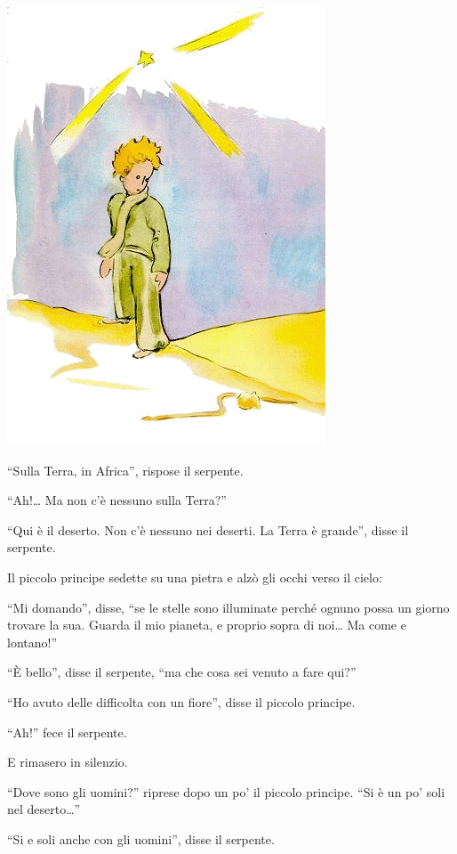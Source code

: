 \documentclass[11pt]{scrbook}
\begin{document}
\begin{center}
\includegraphics{img/17a}
\end{center}

``Sulla Terra, in Africa'', rispose il serpente.

``Ah!\ldots{} Ma non c'è nessuno sulla Terra?''

``Qui è il deserto. Non c'è nessuno nei deserti. La Terra è grande'', disse il serpente.

Il piccolo principe sedette su una pietra e alzò gli occhi verso il cielo:

``Mi domando'', disse, ``se le stelle sono illuminate perché ognuno possa un giorno trovare la sua. Guarda il mio pianeta, e proprio sopra di noi\ldots{} Ma come e lontano!''

``È bello'', disse il serpente, ``ma che cosa sei venuto a fare qui?''

``Ho avuto delle difficolta con un fiore'', disse il piccolo principe.

``Ah!'' fece il serpente.

E rimasero in silenzio.

``Dove sono gli uomini?'' riprese dopo un po' il piccolo principe. ``Si è un po' soli nel deserto\ldots{}''

``Si e soli anche con gli uomini'', disse il serpente.
\end{document}
